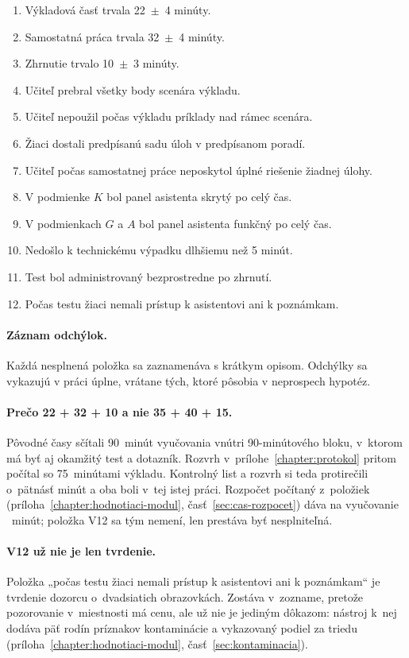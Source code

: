 \begin{enumerate}[nosep, label=V\arabic*.]
    \item Výkladová časť trvala 22~$\pm$~4 minúty.
    \item Samostatná práca trvala 32~$\pm$~4 minúty.
    \item Zhrnutie trvalo 10~$\pm$~3 minúty.
    \item Učiteľ prebral všetky body scenára výkladu.
    \item Učiteľ nepoužil počas výkladu príklady nad rámec scenára.
    \item Žiaci dostali predpísanú sadu úloh v predpísanom poradí.
    \item Učiteľ počas samostatnej práce neposkytol úplné riešenie žiadnej úlohy.
    \item V podmienke $K$ bol panel asistenta skrytý po celý čas.
    \item V podmienkach $G$ a $A$ bol panel asistenta funkčný po celý čas.
    \item Nedošlo k technickému výpadku dlhšiemu než 5 minút.
    \item Test bol administrovaný bezprostredne po zhrnutí.
    \item Počas testu žiaci nemali prístup k asistentovi ani k poznámkam.
\end{enumerate}

\paragraph{Záznam odchýlok.} Každá nesplnená položka sa zaznamenáva s krátkym opisom. Odchýlky sa vykazujú v práci úplne, vrátane tých, ktoré pôsobia v neprospech hypotéz.

\paragraph{Prečo 22 + 32 + 10 a nie 35 + 40 + 15.} Pôvodné časy sčítali 90~minút vyučovania vnútri 90-minútového bloku, v~ktorom má byť aj okamžitý test a dotazník. Rozvrh v~prílohe~\ref{chapter:protokol} pritom počítal so 75~minútami výkladu. Kontrolný list a rozvrh si teda protirečili o~pätnásť minút a oba boli v~tej istej práci. Rozpočet počítaný z~položiek (príloha~\ref{chapter:hodnotiaci-modul}, časť~\ref{sec:cas-rozpocet}) dáva na vyučovanie \instrLessonMin{}~minút; položka V12 sa tým nemení, len prestáva byť nesplniteľná.

\paragraph{V12 už nie je len tvrdenie.} Položka „počas testu žiaci nemali prístup k asistentovi ani k poznámkam“ je tvrdenie dozorcu o~dvadsiatich obrazovkách. Zostáva v~zozname, pretože pozorovanie v~miestnosti má cenu, ale už nie je jediným dôkazom: nástroj k~nej dodáva päť rodín príznakov kontaminácie a vykazovaný podiel za triedu (príloha~\ref{chapter:hodnotiaci-modul}, časť~\ref{sec:kontaminacia}).

